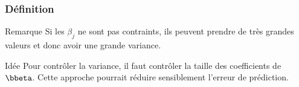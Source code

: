 \documentclass{beamer}\usepackage[]{graphicx}\usepackage[]{color}
\begin{document}
\begin{frame}
  \frametitle{Définition}

  \begin{block}{Remarque}
    Si les   $\beta_j$ ne sont pas contraints,  ils peuvent prendre de très grandes valeurs et donc avoir une grande variance.
  \end{block}

  \begin{block}{Idée}
    Pour contrôler la variance, il faut contrôler la taille des coefficients de  $\bbeta$. Cette approche pourrait réduire sensiblement l'erreur de prédiction.
  \end{block}

\end{frame}
\end{document}
